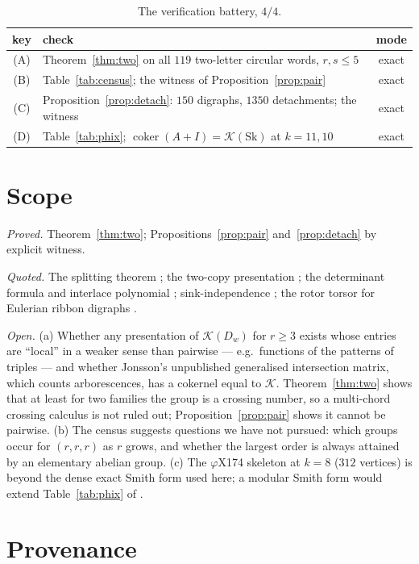 \documentclass[11pt]{article}
\theoremstyle{plain}
\theoremstyle{definition}
\theoremstyle{remark}
\newcommand{\K}{\mathcal{K}}
\newcommand{\coker}{\operatorname{coker}}
\newcommand{\Sk}{\mathrm{Sk}}
\begin{document}
\begin{table}[ht]
\centering\small
\begin{tabular}{clc}
\toprule
key & check & mode\\
\midrule
(A) & Theorem~\ref{thm:two} on all $119$ two-letter circular words, $r,s\le5$ & exact\\
(B) & Table~\ref{tab:census}; the witness of Proposition~\ref{prop:pair} & exact\\
(C) & Proposition~\ref{prop:detach}: $150$ digraphs, $1350$ detachments; the witness & exact\\
(D) & Table~\ref{tab:phix}; $\coker(A+I)=\K(\Sk)$ at $k=11,10$ & exact\\
\bottomrule
\end{tabular}
\caption{The verification battery, $4/4$.}
\label{tab:battery}
\end{table}

\section{Scope}\label{sec:scope}

\emph{Proved.} Theorem~\ref{thm:two}; Propositions~\ref{prop:pair}
and~\ref{prop:detach} by explicit witness.

\emph{Quoted.} The splitting theorem \cite{Bio3}; the two-copy presentation \cite{MMN};
the determinant formula \cite{MacrisPule,Jonsson} and interlace polynomial \cite{ABS};
sink-independence \cite{HLMPPW}; the rotor torsor for Eulerian ribbon digraphs
\cite{Toth}.

\emph{Open.} (a) Whether any presentation of $\K(D_w)$ for $r\ge3$ exists whose entries
are ``local'' in a weaker sense than pairwise --- e.g.\ functions of the patterns of
triples --- and whether Jonsson's unpublished generalised intersection matrix, which
counts arborescences, has a cokernel equal to $\K$. Theorem~\ref{thm:two} shows that at
least for two families the group is a crossing number, so a multi-chord crossing calculus
is not ruled out; Proposition~\ref{prop:pair} shows it cannot be pairwise. (b) The
census suggests questions we have not pursued: which groups occur for $(r,r,r)$ as $r$
grows, and whether the largest order is always attained by an elementary abelian group.
(c) The $\varphi$X174 skeleton at $k=8$ ($312$ vertices) is beyond the dense exact Smith
form used here; a modular Smith form would extend Table~\ref{tab:phix} of \cite{Bio3}.

\section*{Provenance}
\end{document}

